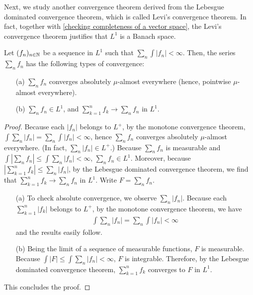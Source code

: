 Next, we study another convergence theorem derived from the Lebesgue dominated convergence theorem, which is called Levi's convergence theorem.
In fact, together with \cref{checking completeness of a vector space}, the Levi's convergence theorem justifies that $L^1$ is a Banach space.
\begin{prop}
    Let $(f_n)_{n\in{\mathbb{N}}}$ be a sequence in $L^1$ such that $\sum_n\int|f_n|<\infty$.
    Then, the series $\sum_n f_n$ has the following types of convergence:
    \begin{enumerate}
        \item[(a)]
        {
            $\sum_n f_n$ converges absolutely $\mu$-almost everywhere (hence, pointwise $\mu$-almost everywhere).
        }
        \item[(b)]
        {
            $\sum_n f_n\in L^1$, and $\sum_{k=1}^n f_k\rightarrow \sum_n f_n$ in $L^1$.
        }
    \end{enumerate}
\end{prop}
\begin{proof}
    \ifinclude
    Because each $|f_n|$ belongs to $L^+$, by the monotone convergence theorem, $\int\sum_n |f_n|=\sum_n \int|f_n|<\infty$, hence $\sum_n f_n$ converges absolutely $\mu$-almost everywhere.
    (In fact, $\sum_n |f_n|\in L^+$.)
    Because $\sum_n f_n$ is measurable and $\int|\sum_n f_n|\leq\int\sum_n |f_n|<\infty$, $\sum_n f_n\in L^1$.
    Moreover, because $|\sum_{k=1}^n f_k|\leq\sum_n|f_n|$, by the Lebesgue dominated convergence theorem, we find that $\sum_{k=1}^n f_k\rightarrow\sum_n f_n$ in $L^1$.
    \else
    Write $F=\sum_n f_n$.
    \begin{enumerate}
        \item[(a)]
        {
            To check absolute convergence, we observe $\sum_n |f_n|$.
            Because each $\sum_{k=1}^n |f_k|$ belongs to $L^+$, by the monotone convergence theorem, we have
            \begin{align*}
                \int\sum_n|f_n|=\sum_n\int|f_n|<\infty
            \end{align*}
            and the results easily follow.
        }
        \item[(b)]
        {
            Being the limit of a sequence of measurable functions, $F$ is measurable.
            Because $\int |F|\leq\int\sum_n|f_n|<\infty$, $F$ is integrable.
            Therefore, by the Lebesgue dominated convergence theorem, $\sum_{k=1}^n f_k$ converges to $F$ in $L^1$.
        }
    \end{enumerate}
    This concludes the proof.
    \fi
\end{proof}

